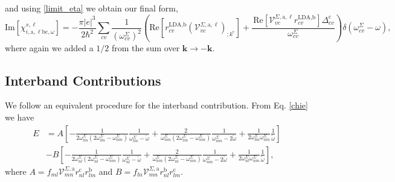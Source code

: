 and using \eqref{limit_eta} we obtain our final form,
\begin{equation}
\mathrm{Im}[\chi_{i,\text{a},\ell\text{b}\text{c},\omega}^{s,\ell}]
=   -\frac{\pi\vert e\vert^3}{2\hbar^2}
    \sum_{cv}\frac{1}{(\omega^{\Sigma}_{cv})^{2}}
\left(
    \mathrm{Re}\left[r^{\text{LDA,b}}_{cv}
    \left(\mathcal{V}^{\Sigma,\text{a},\ell}_{vc}\right)_{;k^{\text{c}}}\right]
+   \frac{\,\mathrm{Re}\left[\mathcal{V}^{\Sigma,\text{a},\ell}_{vc}
    r^{\text{LDA,b}}_{cv}\right]\Delta^{\text{c}}_{cv}}{\omega^{\Sigma}_{cv}} 
\right)\delta(\omega^{\Sigma}_{cv}-\omega)
,
\end{equation}
where again we added a $1/2$ from the sum over $\mathbf{k} \rightarrow -
\mathbf{k}$.



\subsection{Interband Contributions}

We follow an equivalent procedure for the interband contribution. From Eq.
\eqref{chie} we have
\begin{align}\label{ewithaandb}  
E&= A
\left[
-\frac{1}{2\omega^\Sigma_{lm}(2\omega^\Sigma_{lm}-\omega^\Sigma_{nm})}
 \frac{1}{\omega^\Sigma_{lm}-\tilde\omega}
+\frac{2}{\omega^\Sigma_{nm}(2\omega^\Sigma_{lm}-\omega^\Sigma_{nm})}
 \frac{1}{\omega^\Sigma_{nm}-2\tilde\omega}
+\frac{1}{2\omega^\Sigma_{lm}\omega^\Sigma_{nm}}
 \frac{1}{\tilde\omega}
\right]
\nonumber\\
&- B
\left[
-\frac{1}{2\omega^\Sigma_{nl}(2\omega^\Sigma_{nl}-\omega^\Sigma_{nm})}
 \frac{1}{\omega^\Sigma_{nl}-\tilde\omega}
+\frac{2}{\omega^\Sigma_{nm}(2\omega^\Sigma_{nl}-\omega^\Sigma_{nm})}
 \frac{1}{\omega^\Sigma_{nm}-2\tilde\omega}
+\frac{1}{2\omega^\Sigma_{nl}\omega^\Sigma_{nm}}
 \frac{1}{\tilde\omega}
\right],
\end{align}  
where 
$A=f_{ml}\mathcal{V}^{\Sigma,\text{a}}_{mn}r^{\text{c}}_{nl}r^{\text{b}}_{lm}$   
and
$B=f_{ln}\mathcal{V}^{\Sigma,\text{a}}_{mn}r^{\text{b}}_{nl}r^{\text{c}}_{lm}$.

